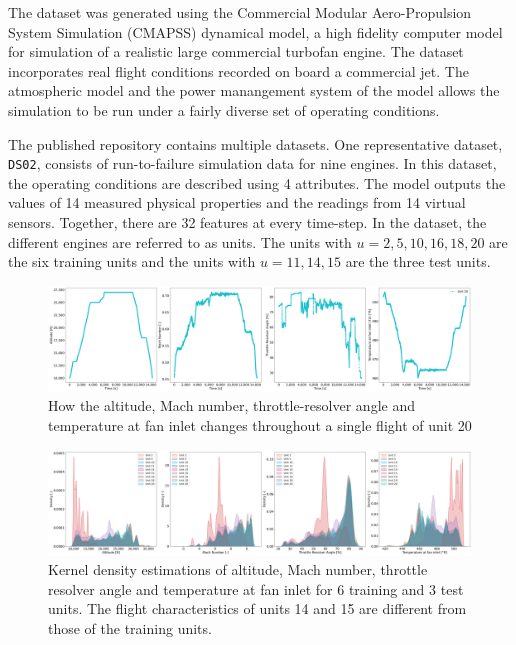 \documentclass[a4paper,12pt]{article}
\begin{document}
The dataset was generated using the Commercial Modular Aero-Propulsion
System Simulation (CMAPSS) dynamical model, a high fidelity computer model for
simulation of a realistic large commercial turbofan engine. The dataset
incorporates real flight conditions recorded on board a commercial jet. The
atmospheric model and the power manangement system of the model allows the
simulation to be run under a fairly diverse set of operating conditions.

The published repository contains multiple datasets. One representative dataset,
\texttt{DS02}, consists of run-to-failure simulation data for nine engines.
In this dataset, the operating conditions are described using 4 attributes.
The model outputs the values of 14 measured physical properties and the
readings from 14 virtual sensors. Together, there are 32 features at every
time-step. In the dataset, the different engines are referred to as units. The
units with $u = 2, 5, 10, 16, 18, 20$ are the six training units and the units
with $u = 11, 14, 15$ are the three test units.

\begin{figure}
    \centering
    \includegraphics[width=\linewidth]{flight_profile.png}
    \caption{How the altitude, Mach number, throttle-resolver angle and temperature at fan inlet changes throughout a single flight of unit 20}
    \label{fig:flight_profile}
\end{figure}


\begin{figure}
    \centering
    \includegraphics[width=\linewidth]{kde.png}
    \caption{Kernel density estimations of altitude, Mach number, throttle resolver angle and temperature at fan inlet for 6 training and 3 test units. The flight characteristics of units 14 and 15 are different from those of the training units.}
    \label{fig:unit_kde}
\end{figure}
\end{document}
